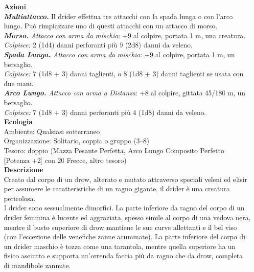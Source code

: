 \begin{multicols}{2}
\smallskip\textbf{Azioni}\\
\emph{\textbf{Multiattacco.}} Il drider effettua tre attacchi con la spada lunga o con l'arco lungo. Può rimpiazzare uno di questi attacchi con un attacco di morso.\\
\emph{\textbf{Morso.} Attacco con arma da mischia}: +9 al colpire, portata 1 m, una creatura.\\
\emph{Colpisce:} 2 (1d4) danni perforanti più 9 (2d8) danni da veleno.\\
\emph{\textbf{Spada Lunga.} Attacco con arma da mischia}: +9 al colpire, portata 1 m, un bersaglio.\\
\emph{Colpisce:} 7 (1d8 + 3) danni taglienti, o 8 (1d8 + 3) danni taglienti se usata con due mani.\\
\emph{\textbf{Arco Lungo.} Attacco con arma a Distanza}: +8 al colpire, gittata 45/180 m, un bersaglio.\\
\emph{Colpisce:} 7 (1d8 + 3) danni perforanti più 4 (1d8) danni da veleno.\\
\textbf{Ecologia}\\
Ambiente: Qualsiasi sotterraneo\\
Organizzazione: Solitario, coppia o gruppo (3–8)\\
Tesoro: doppio (Mazza Pesante Perfetta, Arco Lungo Composito Perfetto [Potenza +2] con 20 Frecce, altro tesoro)\\
\textbf{Descrizione}\\
Creato dal corpo di un drow, alterato e mutato attraverso speciali veleni ed elisir per assumere le caratteristiche di un ragno gigante, il drider è una creatura pericolosa.\\
I drider sono sessualmente dimorfici. La parte inferiore da ragno del corpo di un drider femmina è lucente ed aggraziata, spesso simile al corpo di una vedova nera, mentre il busto superiore di drow mantiene le sue curve allettanti e il bel viso (con l’eccezione delle venefiche zanne acuminate). La parte inferiore del corpo di un drider maschio è tozza come una tarantola, mentre quella superiore ha un fisico asciutto e supporta un’orrenda faccia più da ragno che da drow, completa di mandibole zannute.\\


\end{multicols}

